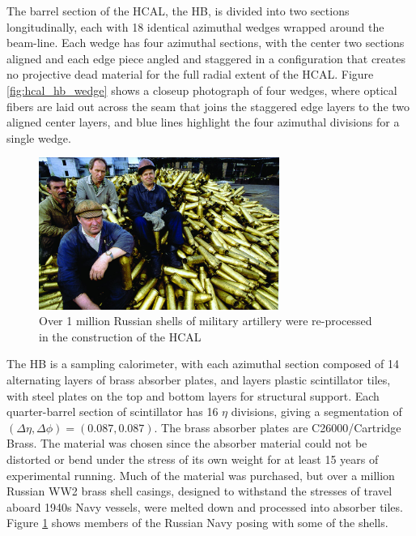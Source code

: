 \par The barrel section of the HCAL, the HB, is divided into two
sections longitudinally, each with 18 identical azimuthal wedges
wrapped around the beam-line.  Each wedge has four azimuthal sections,
with the center two sections aligned and each edge piece angled and
staggered in a configuration that creates no projective dead material
for the full radial extent of the HCAL.  Figure
\ref{fig:hcal_hb_wedge} shows a closeup photograph of four wedges,
where optical fibers are laid out across the seam that joins the
staggered edge layers to the two aligned center layers, and blue lines
highlight the four azimuthal divisions for a single wedge.  

\begin{figure}[h]
   \centering
  \includegraphics[width=0.7\textwidth]{Figures/CMS_Diagrams/HCAL__NavyShells.jpg}
  \caption{Over 1 million Russian shells of military artillery were
    re-processed in the construction of the HCAL} \label{fig:hcal_navy_shells}
\end{figure}

\par The HB is a sampling calorimeter, with each azimuthal section
composed of 14 alternating layers of brass absorber plates, and layers
plastic scintillator tiles, with steel plates on the top and bottom
layers for structural support.  Each quarter-barrel section of
scintillator has 16 $\eta$ divisions, giving a segmentation of
$(\Delta\eta, \Delta\phi) = (0.087, 0.087)$.  The brass absorber
plates are C26000/Cartridge Brass.  The material was chosen since the
absorber material could not be distorted or bend under the stress of
its own weight for at least 15 years of experimental running.  Much of
the material was purchased, but over a million Russian WW2 brass shell
casings, designed to withstand the stresses of travel aboard 1940s
Navy vessels, were melted down and processed into absorber tiles.
Figure \ref{fig:hcal_navy_shells} shows members of the Russian Navy
posing with some of the shells. 

